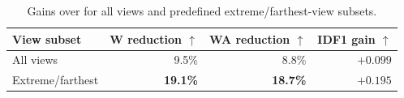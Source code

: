 \begin{table}[t]
  \centering
  \caption{Gains over \humanthree{} for all views and predefined
  extreme/farthest-view subsets.}
  \label{tab:viewpoint-results}
  \small
  \setlength{\tabcolsep}{3.5pt}
  \begin{tabular}{lrrr}
    \toprule
    View subset & W reduction $\uparrow$ & WA reduction $\uparrow$ &
    IDF1 gain $\uparrow$ \\
    \midrule
    All views & 9.5\% & 8.8\% & $+0.099$ \\
    Extreme/farthest & \textbf{19.1\%} & \textbf{18.7\%} &
    $\mathbf{+0.195}$ \\
    \bottomrule
  \end{tabular}
\end{table}
